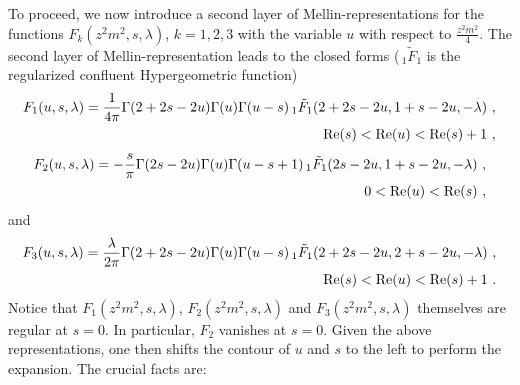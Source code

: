 \documentclass[a4paper,11pt]{article}
\begin{document}
To proceed, we now introduce a second layer of Mellin-representations for the functions $F_k(z^2m^2,s,\lambda)$, $k=1,2,3$ with the variable $u$ with respect to $\frac{z^2m^2}{4}$. The second layer of Mellin-representation leads to the closed forms ($\,_1\tilde F_1$ is the regularized confluent Hypergeometric function)
\begin{align}
F_1(u,s,\lambda)=\frac{1}{4\pi}\Gamma(2+2s-2u)\Gamma(u)\Gamma(u-s)\,_1\tilde F_1(2+2s-2u,1+s-2u,-\lambda) \ , \\
{\rm Re}(s)<{\rm Re} (u)<{\rm Re}(s)+1 \ ,
\end{align}
\begin{align}
F_2(u,s,\lambda)=-\frac{s}{\pi}\Gamma(2s-2u)\Gamma(u)\Gamma(u-s+1)\,_1\tilde F_1(2s-2u,1+s-2u,-\lambda) \ , \\
0<{\rm Re} (u)<{\rm Re}(s) \ , 
\end{align}
and
\begin{align}
F_3(u,s,\lambda)=\frac{\lambda}{2\pi}\Gamma(2+2s-2u)\Gamma(u)\Gamma(u-s)\,_1\tilde F_1(2+2s-2u,2+s-2u,-\lambda) \ , \\
{\rm Re}(s)<{\rm Re} (u)<{\rm Re}(s)+1 \ .
\end{align}
Notice that $F_1(z^2m^2,s,\lambda)$,  $F_2(z^2m^2,s,\lambda)$ and $F_3(z^2m^2,s,\lambda)$ themselves are regular at $s=0$. In particular, $F_2$ vanishes at $s=0$. Given the above representations, one then shifts the contour of $u$ and $s$ to the left to perform the expansion. The crucial facts are:
\end{document}
